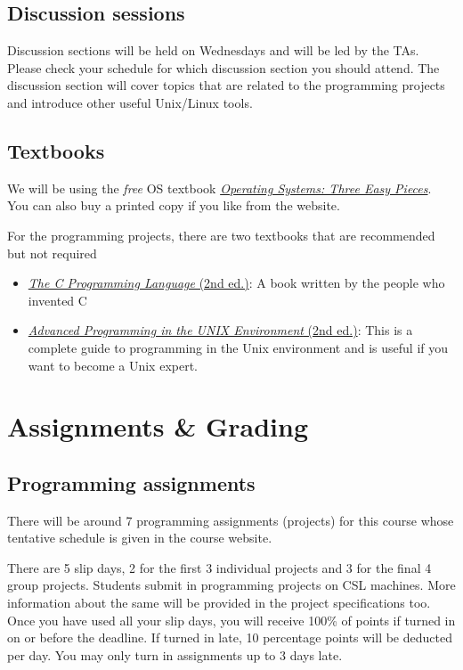 \subsection*{Discussion sessions}
Discussion sections will be held on Wednesdays and will be led by the TAs. Please check your schedule for which
discussion section you should attend. The discussion section will cover topics that are related to the programming
projects and introduce other useful Unix/Linux tools.

\subsection*{Textbooks}

We will be using the \emph{free} OS textbook
\href{https://pages.cs.wisc.edu/~remzi/OSTEP}{\emph{Operating Systems: Three Easy
Pieces}}. You can also buy a printed copy if you like from the website.

For the programming projects, there are two textbooks that are recommended but not required
\begin{itemize}
\item \href{https://a.co/d/6cQipwF}{\emph{The C Programming Language} (2nd
ed.)}: A book written by the people who invented C
\item \href{https://a.co/d/9mCa0Gb}{\emph{Advanced Programming in the UNIX
Environment} (2nd ed.)}: This is a complete guide to programming in the Unix
environment and is useful if you want to become a Unix expert.
        \end{itemize}

\section*{Assignments \& Grading}

\subsection*{Programming assignments}

There will be around 7 programming assignments (projects) for this course whose
tentative schedule is given in the course website.

There are 5 slip days, 2 for the first 3 individual projects and 3 for the final
4 group projects. Students submit in programming projects on CSL machines. More
information about the same will be provided in the project specifications too.
Once you have used all your slip days, you will receive 100\% of points if turned
in on or before the deadline. If turned in late, 10 percentage points will be
deducted per day. You may only turn in assignments up to 3 days late.

